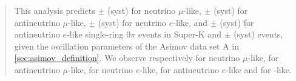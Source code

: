 \begin{frontmatter}
\begin{abstract}
This analysis predicts \NskOscExpectationNumuRunOneNineC{} $\pm$ \NskOscExpectationNumuErrorRunOneNineC{} (syst) for neutrino $\mu$-like, \NskOscExpectationNumuBarRunOneNineC{} $\pm$ \NskOscExpectationNumuBarErrorRunOneNineC{} (syst) for antineutrino $\mu$-like, \NskOscExpectationNueRunOneNineC{} $\pm$ \NskOscExpectationNueErrorRunOneNineC{} (syst) for neutrino $e$-like, and \NskOscExpectationNueBarRunOneNineC{} $\pm$ \NskOscExpectationNueBarErrorRunOneNineC{} (syst) for antineutrino $e$-like single-ring \( 0 \pi \) events in Super-K and \NskOscExpectationNueCConepiRunOneNineC{} $\pm$ \NskOscExpectationNueCConepiErrorRunOneNineC{} (syst) \nueCConepi{} events, given the oscillation parameters of the Asimov data set A in \ref{sec:asimov_definition}. We observe respectively \NskObservedNumuRunOneNineC{} for neutrino $\mu$-like, \NskObservedNumuBarRunOneNineC{}  for antineutrino $\mu$-like, \NskObservedNueRunOneNineC{}  for neutrino $e$-like, \NskObservedNueBarRunOneNineC{}  for antineutrino $e$-like and \NskObservedNueCConepiRunOneNineC{} for \nueCConepi{}-like.

\end{abstract}

\end{frontmatter}
